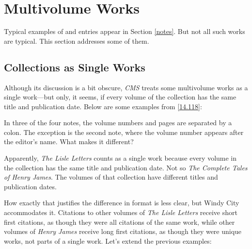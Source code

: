 \documentclass[11pt,letterpaper,oneside]{article}
\begin{document}
\section{Multivolume Works}
\label{multivolume}

Typical examples of  and 
entries appear in Section \ref{notes}. But not all such works are
typical. This section addresses some of them.

\subsection{Collections as Single Works}

Although its discussion is a bit obscure, \textit{CMS} treats some
multivolume works as a single work---but only, it seems, if every
volume of the collection has the same title and publication date.
Below are some examples from \ref{14.118}:

\begin{citeonly}
\item \cite[243]{byrne1981.4}
\item \cite*[32--33]{james1963.5}
\item \cite[245]{byrne1981.4}
\item \cite*[34]{james1963.5}
\end{citeonly}

In three of the four notes, the volume numbers and pages are separated
by a colon. The exception is the second note, where the volume number
appears after the editor's name. What makes it different?

Apparently, \textit{The Lisle Letters} counts as a single work because
every volume in the collection has the same title and publication
date. Not so \textit{The Complete Tales of Henry James}. The volumes
of that collection have different titles and publication dates.

How exactly that justifies the difference in format is less clear, but
Windy City accommodates it. Citations to other volumes of \textit{The
Lisle Letters} receive short first citations, as though they were all
citations of the same work, while other volumes of \textit{Henry
James} receive long first citations, as though they were unique works,
not parts of a single work. Let's extend the previous examples:

\begin{citeonly}
\item \cite[243]{byrne1981.4}
\item \cite*[32--33]{james1963.5}
\item \cite[245]{byrne1981.4}
\item \cite*[34]{james1963.5}
\item \cite[91]{byrne1981.5}
\item \cite*[67]{james1962.4}
\item \cite*[106]{james1962.4}
\end{citeonly}
\end{document}

